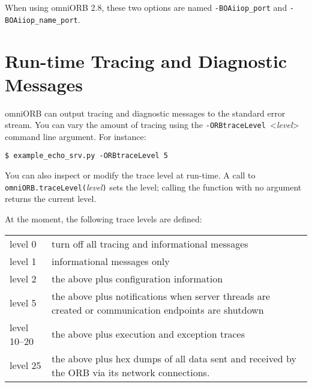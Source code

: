 \documentclass[11pt,twoside,a4paper]{book}
\newcommand{\code}[1]{\texttt{#1}}
\newcommand{\cmdline}[1]{\texttt{#1}}
\newcommand{\dsc}{\discretionary{}{}{}}
\begin{document}
When using omniORB 2.8, these two options are named
\cmdline{-BOAiiop\_port} and \cmdline{-BOAiiop\_name\_port}.



\section{Run-time Tracing and Diagnostic Messages}
\label{sec:rttrace}

omniORB can output tracing and diagnostic messages to the standard
error stream. You can vary the amount of tracing using the
\cmdline{-ORBtraceLevel }<\textit{level}> command line argument. For
instance:

\begin{verbatim}
$ example_echo_srv.py -ORBtraceLevel 5
\end{verbatim}


\noindent You can also inspect or modify the trace level at run-time.
A call to \code{omniORB.\dsc{}traceLevel(}\textit{level}\code{)} sets
the level; calling the function with no argument returns the current
level.

At the moment, the following trace levels are defined:

\vspace{\baselineskip}

\begin{tabular}{lp{}}

level 0      & turn off all tracing and informational messages\\
level 1      & informational messages only\\
level 2      & the above plus configuration information\\

level 5      & the above plus notifications when server threads are
               created or communication endpoints are shutdown\\

level 10--20 & the above plus execution and exception traces\\

level 25     & the above plus hex dumps of all data sent and received
               by the ORB via its network connections.\\
\end{tabular}

\vspace{\baselineskip}
\end{document}
